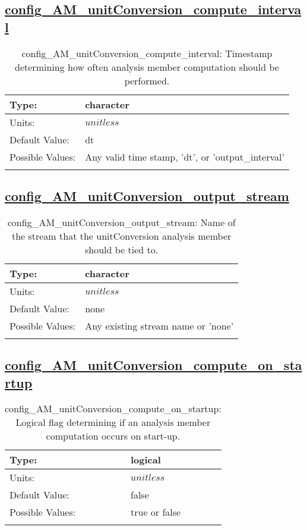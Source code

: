 \subsection[config\_AM\_unitConversion\_compute\_interval]{\hyperref[sec:nm_tab_AM_unitConversion]{config\_AM\_unitConversion\_compute\_interval}}
\label{subsec:nm_sec_config_AM_unitConversion_compute_interval}
\begin{center}
\begin{longtable}{| p{2.0in} || p{4.0in} |}
    \hline
    Type: & character \\
    \hline
    Units: & $unitless$ \\
    \hline
    Default Value: & dt \\
    \hline
    Possible Values: & Any valid time stamp, 'dt', or 'output\_interval' \\
    \hline
    \caption{config\_AM\_unitConversion\_compute\_interval: Timestamp determining how often analysis member computation should be performed.}
\end{longtable}
\end{center}
\subsection[config\_AM\_unitConversion\_output\_stream]{\hyperref[sec:nm_tab_AM_unitConversion]{config\_AM\_unitConversion\_output\_stream}}
\label{subsec:nm_sec_config_AM_unitConversion_output_stream}
\begin{center}
\begin{longtable}{| p{2.0in} || p{4.0in} |}
    \hline
    Type: & character \\
    \hline
    Units: & $unitless$ \\
    \hline
    Default Value: & none \\
    \hline
    Possible Values: & Any existing stream name or 'none' \\
    \hline
    \caption{config\_AM\_unitConversion\_output\_stream: Name of the stream that the unitConversion analysis member should be tied to.}
\end{longtable}
\end{center}
\subsection[config\_AM\_unitConversion\_compute\_on\_startup]{\hyperref[sec:nm_tab_AM_unitConversion]{config\_AM\_unitConversion\_compute\_on\_startup}}
\label{subsec:nm_sec_config_AM_unitConversion_compute_on_startup}
\begin{center}
\begin{longtable}{| p{2.0in} || p{4.0in} |}
    \hline
    Type: & logical \\
    \hline
    Units: & $unitless$ \\
    \hline
    Default Value: & false \\
    \hline
    Possible Values: & true or false \\
    \hline
    \caption{config\_AM\_unitConversion\_compute\_on\_startup: Logical flag determining if an analysis member computation occurs on start-up.}
\end{longtable}
\end{center}
